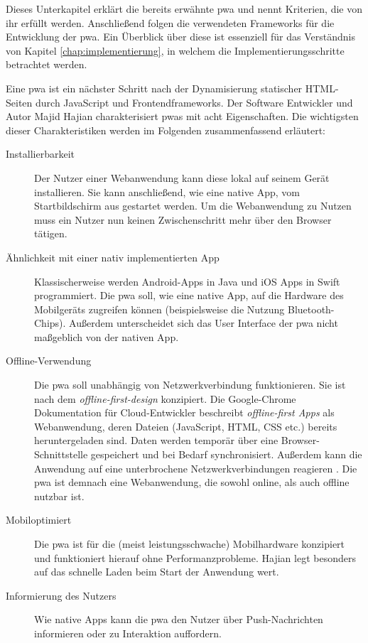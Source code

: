 Dieses Unterkapitel erklärt die bereits erwähnte \acf{pwa} und nennt Kriterien, die von ihr erfüllt werden. Anschließend folgen die verwendeten Frameworks für die Entwicklung der \ac{pwa}. Ein Überblick über diese ist essenziell für das Verständnis von Kapitel \ref{chap:implementierung}, in welchem die Implementierungsschritte betrachtet werden.

Eine \acf{pwa} ist ein nächster Schritt nach der Dynamisierung statischer HTML-Seiten durch JavaScript und Frontendframeworks. Der Software Entwickler und Autor Majid Hajian charakterisiert \ac{pwa}s mit acht Eigenschaften. Die wichtigsten dieser Charakteristiken werden im Folgenden zusammenfassend erläutert:


\begin{description}
  \item [Installierbarkeit]
	  Der Nutzer einer Webanwendung kann diese lokal auf seinem Gerät installieren. Sie kann anschließend, wie eine native App, vom Startbildschirm aus gestartet werden. Um die Webanwendung zu Nutzen muss ein Nutzer nun keinen Zwischenschritt mehr über den Browser tätigen.
  
  \item [Ähnlichkeit mit einer nativ implementierten App]  
 	 Klassischerweise werden Android-Apps in Java und iOS Apps in Swift programmiert. Die \ac{pwa} soll, wie eine native App, auf die Hardware des Mobilgeräts zugreifen können (beispielsweise die Nutzung Bluetooth-Chips). Außerdem unterscheidet sich das User Interface der \ac{pwa} nicht maßgeblich von der nativen App. 
  
  \item [Offline-Verwendung] 
  	Die \ac{pwa} soll unabhängig von Netzwerkverbindung funktionieren. Sie ist nach dem \textit{offline-first-design} konzipiert. Die Google-Chrome Dokumentation für Cloud-Entwickler beschreibt \textit{offline-first Apps} als Webanwendung, deren Dateien (JavaScript, HTML, CSS etc.) bereits heruntergeladen sind. Daten werden temporär über eine Browser-Schnittstelle gespeichert und bei Bedarf synchronisiert. Außerdem kann die Anwendung auf eine unterbrochene Netzwerkverbindungen reagieren \cite{GoogleOfflineApps}. Die \ac{pwa} ist demnach eine Webanwendung, die sowohl online, als auch offline nutzbar ist.

  \item [Mobiloptimiert]  
  	Die \ac{pwa} ist für die (meist leistungsschwache) Mobilhardware konzipiert und funktioniert hierauf ohne Performanzprobleme. Hajian legt besonders auf das schnelle Laden beim Start der Anwendung wert.
  	
  \item [Informierung des Nutzers] 
  	Wie native Apps kann die \ac{pwa} den Nutzer über Push-Nachrichten informieren oder zu Interaktion auffordern.
\end{description}

